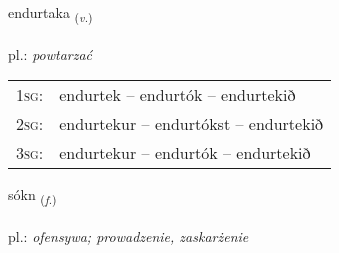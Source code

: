 \documentclass[frontgrid, backgrid]{flacards}\usepackage[]{graphicx}\usepackage[]{xcolor}
\begin{document}
\renewcommand{\flhead}{\vskip5pt \fboxsep=0pt {\small\bfseries\footnotesize Sagnorð | Verb}}
\renewcommand{\fcfoot}{\vskip5pt \fboxsep=0pt \hspace{2pt}{\small\bfseries\footnotesize 2K}}

\renewcommand{\blhead}{\vskip5pt {\small\bfseries\footnotesize Sagnorð | Verb }}
\renewcommand{\bcfoot}{\vskip5pt \hspace{2pt}{\small\bfseries\footnotesize 2K}}


{endurtaka \small{\textsubscript{(\textit{v.})}} \\[1ex] %
 \\
pl.: \emph{powtarzać} \\  [2ex]
\renewcommand*{\arraystretch}{0.8}
\begin{tabular}{p{1cm}l}
\textsc{1sg}: & endurtek -- endurtók -- endurtekið \\ 
\textsc{2sg}: & endurtekur -- endurtókst -- endurtekið \\ 
\textsc{3sg}: & endurtekur -- endurtók -- endurtekið \\ 
\end{tabular}
}

\renewcommand{\flhead}{\vskip5pt \fboxsep=0pt {\small\bfseries\footnotesize Nafnorð | Noun}}
\renewcommand{\fcfoot}{\vskip5pt \fboxsep=0pt \hspace{2pt}{\small\bfseries\footnotesize 2K}}

\renewcommand{\blhead}{\vskip5pt {\small\bfseries\footnotesize Nafnorð | Noun }}
\renewcommand{\bcfoot}{\vskip5pt \hspace{2pt}{\small\bfseries\footnotesize 2K}}


{sókn \small{\textsubscript{(\textit{f.})}} \\[1ex] %
\textphonetic{[souhkn̥]} \\
pl.: \emph{ofensywa; prowadzenie, zaskarżenie} \\  [2ex]
\renewcommand*{\arraystretch}{0.8}
}
\end{document}
